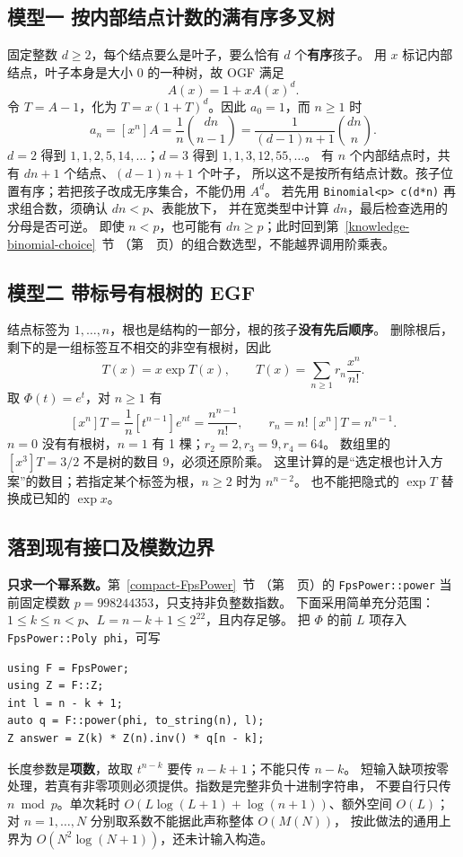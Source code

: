 \subsection{模型一 按内部结点计数的满有序多叉树}
固定整数 $d\ge2$，每个结点要么是叶子，要么恰有 $d$ 个\textbf{有序}孩子。
用 $x$ 标记内部结点，叶子本身是大小 0 的一种树，故 OGF 满足
\[
A(x)=1+xA(x)^d.
\]
令 $T=A-1$，化为 $T=x(1+T)^d$。因此 $a_0=1$，而 $n\ge1$ 时
\[
a_n=[x^n]A=\frac1n\binom{dn}{n-1}
=\frac1{(d-1)n+1}\binom{dn}{n}.
\]
$d=2$ 得到 $1,1,2,5,14,\ldots$；$d=3$ 得到 $1,1,3,12,55,\ldots$。
有 $n$ 个内部结点时，共有 $dn+1$ 个结点、$(d-1)n+1$ 个叶子，
所以这不是按所有结点计数。孩子位置有序；若把孩子改成无序集合，不能仍用 $A^d$。
若先用 \texttt{Binomial<p> c(d*n)} 再求组合数，须确认 $dn<p$、表能放下，
并在宽类型中计算 $dn$，最后检查选用的分母是否可逆。
即使 $n<p$，也可能有 $dn\ge p$；此时回到第~\ref{knowledge-binomial-choice}~节
（第~\pageref{knowledge-binomial-choice}~页）的组合数选型，不能越界调用阶乘表。

\subsection{模型二 带标号有根树的 EGF}
结点标签为 $1,\ldots,n$，根也是结构的一部分，根的孩子\textbf{没有先后顺序}。
删除根后，剩下的是一组标签互不相交的非空有根树，因此
\[
T(x)=x\exp T(x),\qquad
T(x)=\sum_{n\ge1}r_n\frac{x^n}{n!}.
\]
取 $\Phi(t)=e^t$，对 $n\ge1$ 有
\[
[x^n]T=\frac1n[t^{n-1}]e^{nt}
=\frac{n^{n-1}}{n!},\qquad r_n=n!\,[x^n]T=n^{n-1}.
\]
$n=0$ 没有有根树，$n=1$ 有 1 棵；$r_2=2,r_3=9,r_4=64$。
数组里的 $[x^3]T=3/2$ 不是树的数目 9，必须还原阶乘。
这里计算的是“选定根也计入方案”的数目；若指定某个标签为根，$n\ge2$ 时为 $n^{n-2}$。
也不能把隐式的 $\exp T$ 替换成已知的 $\exp x$。

\subsection{落到现有接口及模数边界}
\textbf{只求一个幂系数。}第~\ref{compact-FpsPower}~节
（第~\pageref{compact-FpsPower}~页）的 \texttt{FpsPower::power}
当前固定模数 $p=998244353$，只支持非负整数指数。
下面采用简单充分范围：$1\le k\le n<p$、$L=n-k+1\le2^{22}$，且内存足够。
把 $\Phi$ 的前 $L$ 项存入 \texttt{FpsPower::Poly phi}，可写
\begin{lstlisting}
using F = FpsPower;
using Z = F::Z;
int l = n - k + 1;
auto q = F::power(phi, to_string(n), l);
Z answer = Z(k) * Z(n).inv() * q[n - k];
\end{lstlisting}
长度参数是\textbf{项数}，故取 $t^{n-k}$ 要传 $n-k+1$；不能只传 $n-k$。
短输入缺项按零处理，若真有非零项则必须提供。指数是完整非负十进制字符串，
不要自行只传 $n\bmod p$。单次耗时 $O(L\log(L+1)+\log(n+1))$、额外空间 $O(L)$；
对 $n=1,\ldots,N$ 分别取系数不能据此声称整体 $O(M(N))$，
按此做法的通用上界为 $O(N^2\log(N+1))$，还未计输入构造。


